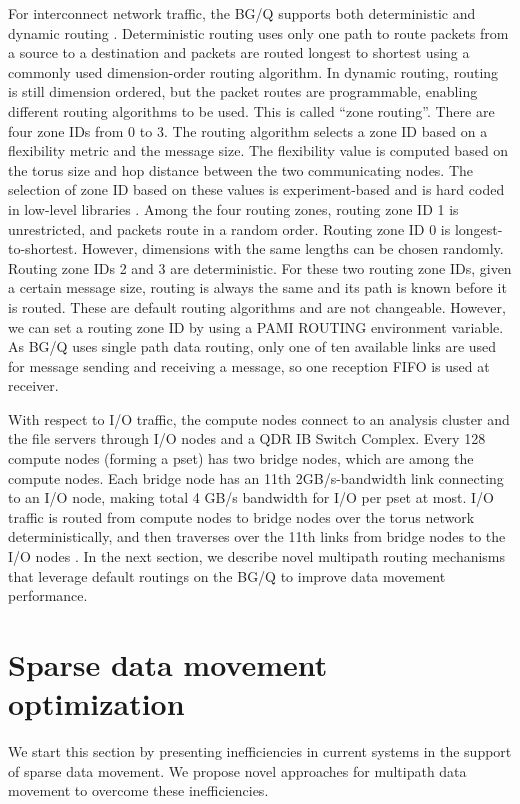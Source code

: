 \documentclass[final,5p,times]{elsarticle}
\begin{document}
For interconnect network traffic, the BG/Q supports both deterministic and dynamic routing \cite{Chen:BGQ}. Deterministic routing uses only one path to route packets from a source to a destination and packets are routed longest to shortest using a commonly used dimension-order routing algorithm. In dynamic routing, routing is still dimension ordered, but the packet routes are programmable, enabling different routing algorithms to be used. This is called ``zone routing''. There are four zone IDs from 0 to 3. The routing algorithm selects a zone ID based on a flexibility metric and the message size. The flexibility value is computed based on the torus size and hop distance between the two communicating nodes. The selection of zone ID based on these values is experiment-based and is hard coded in low-level libraries \cite{BGQRedbook:Gilge}. Among the four routing zones, routing zone ID 1 is unrestricted, and packets route in a random order. Routing zone ID 0 is longest-to-shortest. However, dimensions with the same lengths can be chosen randomly. Routing zone IDs 2 and 3 are deterministic. For these two routing zone IDs, given a certain message size, routing is always the same and its path is known before it is routed. These are default routing algorithms and are not changeable. However, we can set a routing zone ID by using a PAMI ROUTING environment variable. As BG/Q uses single path data routing, only one of ten available links are used for message sending and receiving a message, so one reception FIFO is used at receiver.

With respect to I/O traffic, the compute nodes connect to an analysis cluster and the file servers through I/O nodes and a QDR IB Switch Complex. Every 128 compute nodes (forming a pset) has two bridge nodes, which are among the compute nodes. Each bridge node has an 11th 2GB/s-bandwidth link connecting to an I/O node, making total 4 GB/s bandwidth for I/O per pset at most. I/O traffic is routed from compute nodes to bridge nodes over the torus network deterministically, and then traverses over the 11th links from bridge nodes to the I/O nodes \cite{Chen:BGQInterconnection}. In the next section, we describe novel multipath routing mechanisms that leverage default routings on the BG/Q to improve data movement performance.

\section{Sparse data movement optimization}
\label{sec:approaches}
We start this section by presenting inefficiencies in current systems in the support of sparse data movement. We propose novel approaches for multipath data movement to overcome these inefficiencies.
\end{document}
